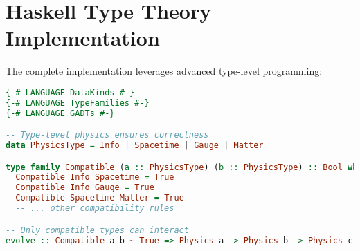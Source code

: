 \documentclass{article}
\begin{document}
\section{Haskell Type Theory Implementation}

The complete implementation leverages advanced type-level programming:

\begin{lstlisting}[language=Haskell]
{-# LANGUAGE DataKinds #-}
{-# LANGUAGE TypeFamilies #-}
{-# LANGUAGE GADTs #-}

-- Type-level physics ensures correctness
data PhysicsType = Info | Spacetime | Gauge | Matter

type family Compatible (a :: PhysicsType) (b :: PhysicsType) :: Bool where
  Compatible Info Spacetime = True
  Compatible Info Gauge = True
  Compatible Spacetime Matter = True
  -- ... other compatibility rules

-- Only compatible types can interact
evolve :: Compatible a b ~ True => Physics a -> Physics b -> Physics c
\end{lstlisting}
\end{document}
